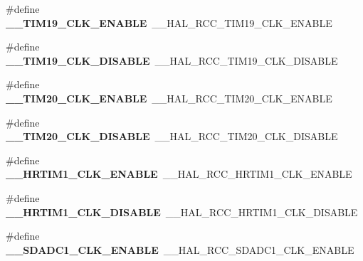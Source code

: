 \begin{DoxyCompactItemize}
\item 
\mbox{\label{group___h_a_l___r_c_c___aliased_ga6e908d1b2908430d1ed2af109dd81d31}} 
\#define {\bfseries \+\_\+\+\_\+\+T\+I\+M19\+\_\+\+C\+L\+K\+\_\+\+E\+N\+A\+B\+LE}~\+\_\+\+\_\+\+H\+A\+L\+\_\+\+R\+C\+C\+\_\+\+T\+I\+M19\+\_\+\+C\+L\+K\+\_\+\+E\+N\+A\+B\+LE
\item 
\mbox{\label{group___h_a_l___r_c_c___aliased_ga3b32538dedb67006d1b9c9aa210ed5f3}} 
\#define {\bfseries \+\_\+\+\_\+\+T\+I\+M19\+\_\+\+C\+L\+K\+\_\+\+D\+I\+S\+A\+B\+LE}~\+\_\+\+\_\+\+H\+A\+L\+\_\+\+R\+C\+C\+\_\+\+T\+I\+M19\+\_\+\+C\+L\+K\+\_\+\+D\+I\+S\+A\+B\+LE
\item 
\mbox{\label{group___h_a_l___r_c_c___aliased_ga1be7819837c9d5ce89b5006858aa2c78}} 
\#define {\bfseries \+\_\+\+\_\+\+T\+I\+M20\+\_\+\+C\+L\+K\+\_\+\+E\+N\+A\+B\+LE}~\+\_\+\+\_\+\+H\+A\+L\+\_\+\+R\+C\+C\+\_\+\+T\+I\+M20\+\_\+\+C\+L\+K\+\_\+\+E\+N\+A\+B\+LE
\item 
\mbox{\label{group___h_a_l___r_c_c___aliased_gac795b2f6f86b1444869608b8cdd2ded5}} 
\#define {\bfseries \+\_\+\+\_\+\+T\+I\+M20\+\_\+\+C\+L\+K\+\_\+\+D\+I\+S\+A\+B\+LE}~\+\_\+\+\_\+\+H\+A\+L\+\_\+\+R\+C\+C\+\_\+\+T\+I\+M20\+\_\+\+C\+L\+K\+\_\+\+D\+I\+S\+A\+B\+LE
\item 
\mbox{\label{group___h_a_l___r_c_c___aliased_gaa8ef9aa8aac2736d3795d30295bef523}} 
\#define {\bfseries \+\_\+\+\_\+\+H\+R\+T\+I\+M1\+\_\+\+C\+L\+K\+\_\+\+E\+N\+A\+B\+LE}~\+\_\+\+\_\+\+H\+A\+L\+\_\+\+R\+C\+C\+\_\+\+H\+R\+T\+I\+M1\+\_\+\+C\+L\+K\+\_\+\+E\+N\+A\+B\+LE
\item 
\mbox{\label{group___h_a_l___r_c_c___aliased_gaa4f872cf7c18f0c24f989024d5c6578f}} 
\#define {\bfseries \+\_\+\+\_\+\+H\+R\+T\+I\+M1\+\_\+\+C\+L\+K\+\_\+\+D\+I\+S\+A\+B\+LE}~\+\_\+\+\_\+\+H\+A\+L\+\_\+\+R\+C\+C\+\_\+\+H\+R\+T\+I\+M1\+\_\+\+C\+L\+K\+\_\+\+D\+I\+S\+A\+B\+LE
\item 
\mbox{\label{group___h_a_l___r_c_c___aliased_ga276bdce4ddd1f6b148ce55ccf3160500}} 
\#define {\bfseries \+\_\+\+\_\+\+S\+D\+A\+D\+C1\+\_\+\+C\+L\+K\+\_\+\+E\+N\+A\+B\+LE}~\+\_\+\+\_\+\+H\+A\+L\+\_\+\+R\+C\+C\+\_\+\+S\+D\+A\+D\+C1\+\_\+\+C\+L\+K\+\_\+\+E\+N\+A\+B\+LE

\end{DoxyCompactItemize}
